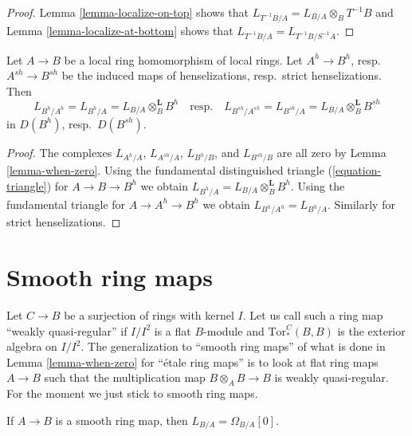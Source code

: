 \begin{proof}
Lemma \ref{lemma-localize-on-top} shows that
$L_{T^{-1}B/A} = L_{B/A} \otimes_B T^{-1}B$
and Lemma \ref{lemma-localize-at-bottom}
shows that $L_{T^{-1}B/A} = L_{T^{-1}B/S^{-1}A}$.
\end{proof}

\begin{lemma}
\label{lemma-cotangent-complex-henselization}
Let $A \to B$ be a local ring homomorphism of local rings.
Let $A^h \to B^h$, resp.\ $A^{sh} \to B^{sh}$ be the induced
maps of henselizations, resp.\ strict henselizations.
Then
$$
L_{B^h/A^h} = L_{B^h/A} = L_{B/A} \otimes_B^\mathbf{L} B^h
\quad\text{resp.}\quad
L_{B^{sh}/A^{sh}} = L_{B^{sh}/A} = L_{B/A} \otimes_B^\mathbf{L} B^{sh}
$$
in $D(B^h)$, resp.\ $D(B^{sh})$.
\end{lemma}

\begin{proof}
The complexes $L_{A^h/A}$, $L_{A^{sh}/A}$, $L_{B^h/B}$, and
$L_{B^{sh}/B}$ are all zero by Lemma \ref{lemma-when-zero}.
Using the fundamental distinguished triangle (\ref{equation-triangle})
for $A \to B \to B^h$ we obtain
$L_{B^h/A} = L_{B/A} \otimes_B^\mathbf{L} B^h$.
Using the fundamental triangle for $A \to A^h \to B^h$
we obtain $L_{B^h/A^h} = L_{B^h/A}$.
Similarly for strict henselizations.
\end{proof}




\section{Smooth ring maps}
\label{section-smooth}

\noindent
Let $C \to B$ be a surjection of rings with kernel $I$. Let us call such
a ring map ``weakly quasi-regular'' if $I/I^2$ is a flat $B$-module and
$\text{Tor}_*^C(B, B)$ is the exterior algebra on $I/I^2$.
The generalization to ``smooth ring maps'' of what is done in
Lemma \ref{lemma-when-zero} for ``\'etale ring maps'' is to look
at flat ring maps $A \to B$ such that the multiplication map
$B \otimes_A B \to B$ is weakly quasi-regular. For the moment we just stick to
smooth ring maps.

\begin{lemma}
\label{lemma-when-projective}
If $A \to B$ is a smooth ring map, then $L_{B/A} = \Omega_{B/A}[0]$.
\end{lemma}

